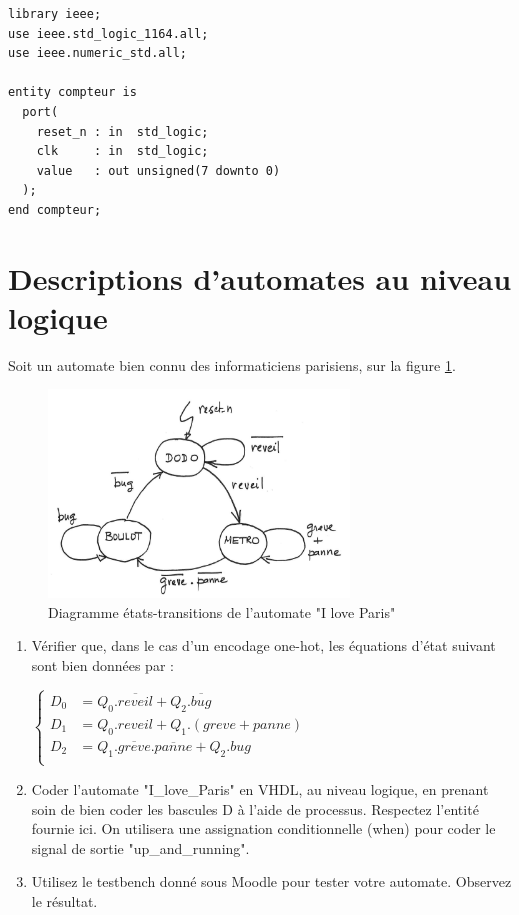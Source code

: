 \documentclass[a4paper,11pt]{article}
\begin{document}
\begin{lstlisting}
library ieee;
use ieee.std_logic_1164.all;
use ieee.numeric_std.all;

entity compteur is
  port(
    reset_n : in  std_logic;
    clk     : in  std_logic;
    value   : out unsigned(7 downto 0)
  );
end compteur;
\end{lstlisting}


\section{Descriptions d'automates au niveau logique}
Soit un automate bien connu des informaticiens parisiens, sur la figure \ref{iloveparis}.

\begin{figure}
  \centering
  \includegraphics[width=8cm]{./iloveparis.png}
  \caption{Diagramme états-transitions de l'automate "I love Paris"}
  \label{iloveparis}
\end{figure}


\begin{enumerate}
  \item Vérifier que, dans le cas d'un encodage one-hot, les équations d'état suivant sont bien données par :

  $\left\{
  \begin{array}{rl}
    D_0 &= Q_0.\overline{reveil}+Q_2.\overline{bug} \\
    D_1 &= Q_0.reveil+Q_1.(greve+panne)\\
    D_2 &= Q_1.\overline{greve}.\overline{panne}+Q_2.bug\\
  \end{array}
  \right.$

  \item Coder l'automate "I\_love\_Paris" en VHDL, au niveau logique, en prenant soin de bien coder les bascules D à l'aide de processus.
  Respectez l'entité fournie ici. On utilisera une assignation conditionnelle (when) pour coder le signal de sortie "up\_and\_running".
  \lstset{inputencoding=utf8}
  
  \item Utilisez le testbench donné sous Moodle pour tester votre automate. Observez le résultat.
\end{enumerate}
\end{document}
